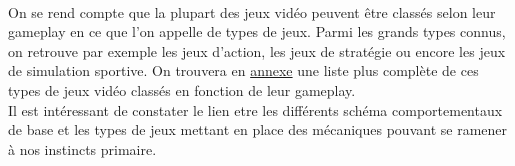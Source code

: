 \paragraph{}On se rend compte que la plupart des jeux vidéo peuvent être classés selon leur gameplay en ce que l'on appelle de types de jeux. Parmi les grands types connus, on retrouve par exemple les jeux d'action, les jeux de stratégie ou encore les jeux de simulation sportive. On trouvera en \href{types_jeux}{annexe} une liste plus complète de ces types de jeux vidéo classés en fonction de leur gameplay. \\

Il est intéressant de constater le lien etre les différents schéma comportementaux de base et les types de jeux mettant en place des mécaniques pouvant se ramener à nos instincts primaire.

